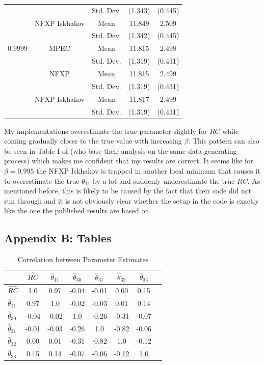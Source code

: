 \begin{table}[H]
\begin{tabular}{l c c c c}
		& & Std. Dev. & (1.343) & (0.445) \\
		& NFXP Iskhakov & Mean & 11.849 & 2.509 \\
		& & Std. Dev. & (1.342) & (0.445) \\ \midrule
		0.9999 & MPEC & Mean & 11.815 & 2.498 \\
		& & Std. Dev. & (1.319) & (0.431) \\
		& NFXP & Mean & 11.815 & 2.499 \\
		& & Std. Dev. & (1.319) & (0.431) \\
		& NFXP Iskhakov & Mean & 11.817	& 2.499 \\
		& & Std. Dev. & (1.319) & (0.431) \\ \bottomrule
	\end{tabular}
\end{table}

My implementations overestimate the true parameter slightly for $RC$ while coming gradually closer to the true value with increasing $\beta$. This pattern can also be seen in Table I of \cite{Su.Judd.2012} (who base their analysis on the same data generating process) which makes me confident that my results are correct. It seems like for $\beta = 0.995$ the NFXP Iskhakov is trapped in another local minimum that causes it to overestimate the true $\theta_{11}$ by a lot and suddenly underestimate the true $RC$. As mentioned before, this is likely to be caused by the fact that their code did not run through and it is not obviously clear whether the setup in the code is exactly like the one the published results are based on.

\subsection{Appendix B: Tables}

\begin{table}[H]
	\centering
	\caption{Correlation between Parameter Estimates}
	\label{correlation}
	\begin{tabular}{l | c c c c c c c}
		\toprule\midrule
		& $\hat{RC}$ & $\hat\theta_{11}$ & $\hat\theta_{30}$ & $\hat\theta_{31}$ & $\hat\theta_{32}$ & $\hat\theta_{33}$ \\ \midrule
		$\hat{RC}$ & 1.0 & 0.97 & -0.04 & -0.01 & 0.00 & 0.15 \\
		$\hat\theta_{11}$ & 0.97 & 1.0 & -0.02 & -0.03 & 0.01 &	0.14 \\
		$\hat\theta_{30}$ &	-0.04 &	-0.02 &	1.0	& -0.26 & -0.31 & -0.07 \\
		$\hat\theta_{31}$ &	-0.01 &	-0.03 &	-0.26 &	1.0 & -0.82 & -0.06 \\
		$\hat\theta_{32}$ &	0.00 & 0.01 & -0.31 & -0.82 & 1.0 &	-0.12 \\
		$\hat\theta_{33}$ &	0.15 & 0.14 & -0.07 & -0.06 & -0.12 & 1.0 \\
		\bottomrule
	\end{tabular}
\end{table}



